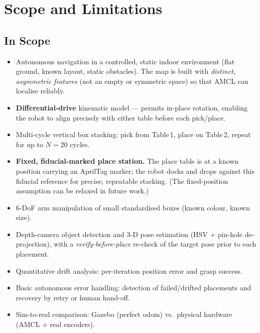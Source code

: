 \documentclass[11pt,a4paper]{article}
\begin{document}
\newpage

\section{Scope and Limitations}

\subsection{In Scope}
\begin{itemize}[label=\checkmark, leftmargin=1.5em]
    \item Autonomous navigation in a controlled, static indoor environment (flat ground,
    known layout, static obstacles). The map is built with \emph{distinct, asymmetric
    features} (not an empty or symmetric space) so that AMCL can localise reliably.
    \item \textbf{Differential-drive} kinematic model --- permits in-place rotation,
    enabling the robot to align precisely with either table before each pick/place.
    \item Multi-cycle vertical box stacking: pick from Table\,1, place on Table\,2,
    repeat for up to $N=20$ cycles.
    \item \textbf{Fixed, fiducial-marked place station.} The place table is at a known
    position carrying an AprilTag marker; the robot docks and drops against this
    fiducial reference for precise, repeatable stacking. (The fixed-position assumption
    can be relaxed in future work.)
    \item 6-DoF arm manipulation of small standardised boxes (known colour, known size).
    \item Depth-camera object detection and 3-D pose estimation (HSV + pin-hole
    de-projection), with a \emph{verify-before-place} re-check of the target pose prior
    to each placement.
    \item Quantitative drift analysis: per-iteration position error and grasp success.
    \item Basic autonomous error handling: detection of failed/drifted placements and
    recovery by retry or human hand-off.
    \item Sim-to-real comparison: Gazebo (perfect odom) vs.\ physical hardware
    (AMCL + real encoders).
\end{itemize}
\end{document}
